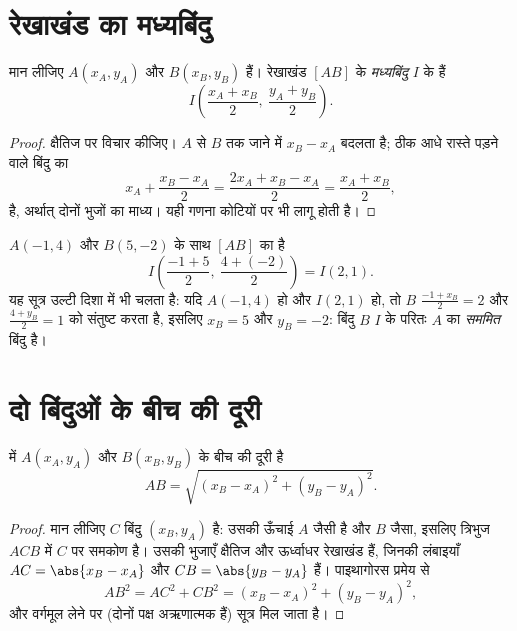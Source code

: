 \section{रेखाखंड का मध्यबिंदु}

\begin{proposition}[मध्यबिंदु सूत्र]\label{prop:g10:coordgeom:midpoint}
मान लीजिए $A(x_A, y_A)$ और $B(x_B, y_B)$ हैं। रेखाखंड $[AB]$ के
\emph{मध्यबिंदु} $I$ के  हैं
\[
I\left(\frac{x_A + x_B}{2},\ \frac{y_A + y_B}{2}\right).
\]
\end{proposition}

\begin{proof}
क्षैतिज  पर विचार कीजिए। $A$ से $B$ तक जाने में  $x_B - x_A$ बदलता
है; ठीक आधे रास्ते पड़ने वाले बिंदु का 
\[
x_A + \frac{x_B - x_A}{2} = \frac{2x_A + x_B - x_A}{2}
= \frac{x_A + x_B}{2},
\]
है, अर्थात् दोनों भुजों का माध्य। यही गणना कोटियों पर भी लागू होती है।
\end{proof}

\begin{example}\label{ex:g10:coordgeom:midpoint}
$A(-1, 4)$ और $B(5, -2)$ के साथ $[AB]$ का  है
\[
I\left(\frac{-1 + 5}{2},\ \frac{4 + (-2)}{2}\right) = I(2, 1).
\]
यह सूत्र उल्टी दिशा में भी चलता है: यदि $A(-1, 4)$ हो और  $I(2, 1)$ हो, तो
$B$ $\frac{-1 + x_B}{2} = 2$ और $\frac{4 + y_B}{2} = 1$ को संतुष्ट करता है, इसलिए $x_B = 5$ और $y_B = -2$: बिंदु $B$ $I$
के परितः $A$ का \emph{सममित} बिंदु है।
\end{example}

\section{दो बिंदुओं के बीच की दूरी}

\begin{theorem}[दूरी सूत्र]\label{thm:g10:coordgeom:distance}
 में $A(x_A, y_A)$ और $B(x_B, y_B)$ के बीच की दूरी है
\[
AB = \sqrt{(x_B - x_A)^2 + (y_B - y_A)^2}.
\]
\end{theorem}

\begin{proof}
मान लीजिए $C$ बिंदु $(x_B, y_A)$ है: उसकी ऊँचाई $A$ जैसी है और  $B$ जैसा,
इसलिए त्रिभुज $ACB$ में $C$ पर समकोण है। उसकी भुजाएँ क्षैतिज और ऊर्ध्वाधर
रेखाखंड हैं, जिनकी लंबाइयाँ $AC = \abs{x_B - x_A}$ और $CB = \abs{y_B - y_A}$ हैं। पाइथागोरस प्रमेय से
\[
AB^2 = AC^2 + CB^2 = (x_B - x_A)^2 + (y_B - y_A)^2,
\]
और वर्गमूल लेने पर (दोनों पक्ष अऋणात्मक हैं) सूत्र मिल जाता है।
\end{proof}

